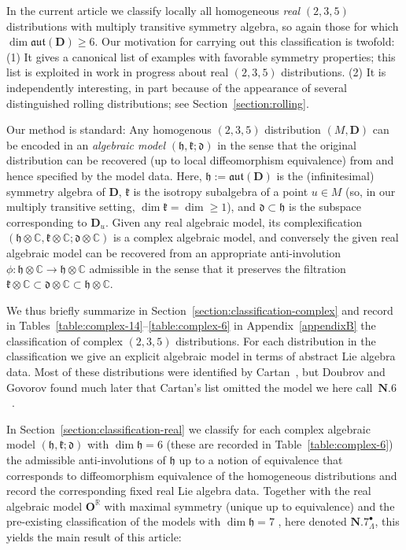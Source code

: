 \documentclass[pdftex]{sigma}
\newcommand{\bbC}{\mathbb{C}}
\newcommand{\bbR}{\mathbb{R}}
\newcommand{\mbD}{\mathbf{D}}
\newcommand{\mbO}{\mathbf{O}}
\newcommand{\mfd} {\mathfrak{d}}
\newcommand{\mfh} {\mathfrak{h}}
\newcommand{\mfk} {\mathfrak{k}}
\newcommand{\mfaut}{\mathfrak{aut}}
\numberwithin{equation}{section}
\begin{document}
In the current article we classify locally all homogeneous \textit{real} $(2, 3, 5)$ distributions with multiply transitive symmetry algebra, so again those for which $\dim \mfaut(\mbD) \geq 6$. Our motivation for carrying out this classification is twofold: (1) It gives a canonical list of examples with favorable symmetry properties; this list is exploited in work in progress about real $(2, 3, 5)$ distributions. (2) It is independently interesting, in part because of the appearance of several distinguished rolling distributions; see Section~\ref{section:rolling}.

Our method is standard: Any homogenous $(2, 3, 5)$ distribution $(M, \mbD)$ can be encoded in an \textit{algebraic model} $(\mfh, \mfk; \mfd)$ in the sense that the original distribution can be recovered (up to local diffeomorphism equivalence) from and hence specified by the model data. Here, $\mfh := \mfaut(\mbD)$ is the (infinitesimal) symmetry algebra of $\mbD$, $\mfk$ is the isotropy subalgebra of a point $u \in M$ (so, in our multiply transitive setting, $\dim \mfk = \dim \geq 1$), and $\mfd \subset \mfh$ is the subspace corresponding to $\mbD_u$. Given any real algebraic model, its complexification $(\mfh \otimes \bbC, \mfk \otimes \bbC; \mfd \otimes \bbC)$ is a complex algebraic model, and conversely the given real algebraic model can be recovered from an appropriate anti-involution $\phi\colon \mfh \otimes \bbC \to \mfh \otimes \bbC$ admissible in the sense that it preserves the filtration $\mfk \otimes \bbC \subset \mfd \otimes \bbC \subset \mfh \otimes \bbC$.

We thus briefly summarize in Section~\ref{section:classification-complex} and record in Tables~\ref{table:complex-14}--\ref{table:complex-6} in Appendix~\ref{appendixB} the classification of complex $(2, 3, 5)$ distributions. For each distribution in the classification we give an explicit algebraic model in terms of abstract Lie algebra data. Most of these distributions were identified by Cartan~\cite{CartanFiveVariables}, but Doubrov and Govorov found much later that Cartan's list omitted the model we here call~$\mathbf{N.6}$~\cite{DoubrovGovorovCounterexample}.

In Section~\ref{section:classification-real} we classify for each complex algebraic model $(\mfh, \mfk; \mfd)$ with $\dim \mfh = 6$ (these are recorded in Table~\ref{table:complex-6}) the admissible anti-involutions of $\mfh$ up to a notion of equivalence that corresponds to diffeomorphism equivalence of the homogeneous distributions and record the corresponding fixed real Lie algebra data. Together with the real algebraic model $\mbO^{\bbR}$ with maximal symmetry (unique up to equivalence) and the pre-existing classification of the models with $\dim \mfh = 7$ \cite[Theorem~2]{DoubrovZelenko}, here denoted $\mathbf{N.7}_{\Lambda}^{\bullet}$, this yields the main result of this article:
\end{document}
